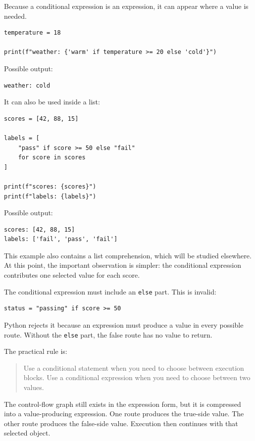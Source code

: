 \documentclass[a4paper,twoside]{report}
\begin{document}
Because a conditional expression is an expression, it can appear where a value is needed.

\begin{verbatim}
temperature = 18

print(f"weather: {'warm' if temperature >= 20 else 'cold'}")
\end{verbatim}

Possible output:

\begin{verbatim}
weather: cold
\end{verbatim}

It can also be used inside a list:

\begin{verbatim}
scores = [42, 88, 15]

labels = [
    "pass" if score >= 50 else "fail"
    for score in scores
]

print(f"scores: {scores}")
print(f"labels: {labels}")
\end{verbatim}

Possible output:

\begin{verbatim}
scores: [42, 88, 15]
labels: ['fail', 'pass', 'fail']
\end{verbatim}

This example also contains a list comprehension, which will be studied elsewhere. At this point, the important observation is simpler: the conditional expression contributes one selected value for each score.

The conditional expression must include an \texttt{else} part. This is invalid:

\begin{verbatim}
status = "passing" if score >= 50
\end{verbatim}

Python rejects it because an expression must produce a value in every possible route. Without the \texttt{else} part, the false route has no value to return.

The practical rule is:

\begin{quote}
Use a conditional statement when you need to choose between execution blocks. Use a conditional expression when you need to choose between two values.
\end{quote}

The control-flow graph still exists in the expression form, but it is compressed into a value-producing expression. One route produces the true-side value. The other route produces the false-side value. Execution then continues with that selected object.
\end{document}
